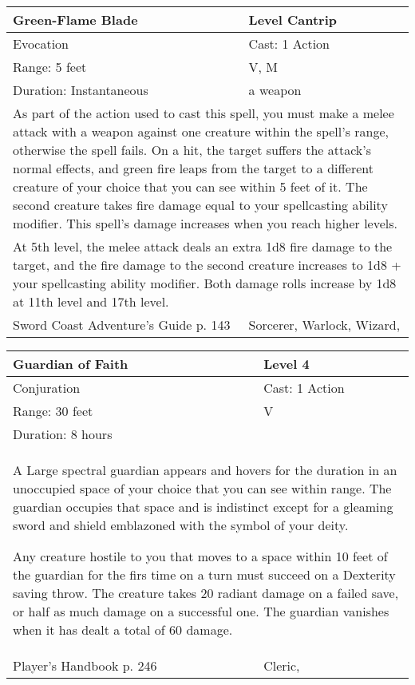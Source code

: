 \documentclass[11pt]{report}
\begin{document}
\begin{table}[H]
	\begin{tabular}{||p{6cm}|p{6cm}||}
		\hline\hline
		\bf{Green-Flame Blade} & Level Cantrip\\ \hline
		Evocation & Cast: 1 Action\\ \hline
		Range: 5 feet & V, M\\ \hline
		Duration: Instantaneous & a weapon\\ \hline
		\multicolumn{2}{||p{12cm}||}{As part of the action used to cast this spell, you must make a melee attack with a weapon against one creature within the spell's range, otherwise the spell fails. On a hit, the target suffers the attack's normal effects, and green fire leaps from the target to a different creature of your choice that you can see within 5 feet of it. The second creature takes fire damage equal to your spellcasting ability modifier. This spell's damage increases when you reach higher levels.}\\ \hline
		\multicolumn{2}{||p{12cm}||}{At 5th level, the melee attack deals an extra 1d8 fire damage to the target, and the fire damage to the second creature increases to 1d8 + your spellcasting ability modifier. Both damage rolls increase by 1d8 at 11th level and 17th level.}\\ \hline
Sword Coast Adventure's Guide p. 143 & Sorcerer, Warlock, Wizard, \\ \hline\hline
	\end{tabular}
\end{table}

\begin{table}[H]
	\begin{tabular}{||p{6cm}|p{6cm}||}
		\hline\hline
		\bf{Guardian of Faith} & Level 4\\ \hline
		Conjuration & Cast: 1 Action\\ \hline
		Range: 30 feet & V\\ \hline
		Duration: 8 hours & \\ \hline
		\multicolumn{2}{||p{12cm}||}{A Large spectral guardian appears and hovers for the duration in an unoccupied space of your choice that you can see within range. The guardian occupies that space and is indistinct except for a gleaming sword and shield emblazoned with the symbol of your deity.

Any creature hostile to you that moves to a space within 10 feet of the guardian for the firs time on a turn must succeed on a Dexterity saving throw. The creature takes 20 radiant damage on a failed save, or half as much damage on a successful one. The guardian vanishes when it has dealt a total of 60 damage.}\\ \hline
Player's Handbook p. 246 & Cleric, \\ \hline\hline
	\end{tabular}
\end{table}
\end{document}
